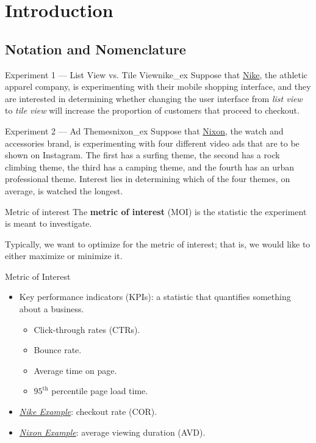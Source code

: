 \chapter{Introduction}
\section{Notation and Nomenclature}
\begin{Example}{Experiment 1 --- List View vs. Tile View}{nike_ex}
    Suppose that \href{https://www.nike.com/ca/}{Nike}, the athletic apparel company,
    is experimenting with their mobile shopping interface, and they are interested in determining
    whether changing the user interface from \emph{list view}
    to \emph{tile view} will increase the proportion
    of customers that proceed to checkout.
\end{Example}
\begin{Example}{Experiment 2 --- Ad Themes}{nixon_ex}
    Suppose that \href{https://www.nixon.com/ca/en}{Nixon},
    the watch and accessories brand, is experimenting
    with four different video ads that are to be shown on Instagram.
    The first has a surfing theme, the second has a rock climbing theme, the third
    has a camping theme, and the fourth has an urban professional theme.
    Interest lies in determining which of the four themes, on average,
    is watched the longest.
\end{Example}
\begin{Definition}{Metric of interest}{}
    The \textbf{metric of interest} (MOI) is the statistic the experiment is
    meant to investigate.
\end{Definition}
\begin{Remark}{}{}
    Typically, we want to optimize for the metric of interest; that is,
    we would like to either maximize or minimize it.
\end{Remark}
\begin{Example}{Metric of Interest}{}
    \begin{itemize}
        \item Key performance indicators (KPIs): a statistic that
              quantifies something about a business.
              \begin{itemize}
                  \item Click-through rates (CTRs).
                  \item Bounce rate.
                  \item Average time on page.
                  \item $ 95^{\text{th}} $ percentile page load time.
              \end{itemize}
        \item \emph{\hyperref[ex:nike_ex]{Nike Example}}: checkout rate (COR).
        \item \emph{\hyperref[ex:nixon_ex]{Nixon Example}}: average viewing duration (AVD).
    \end{itemize}
\end{Example}
